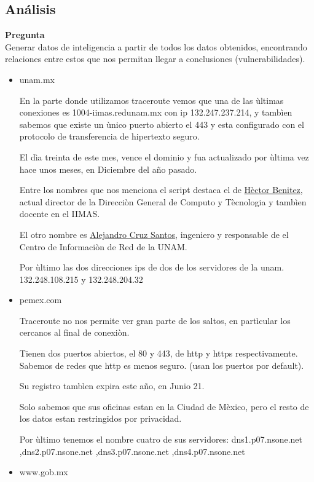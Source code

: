 \documentclass{article}
\newenvironment{problem}[2][Pregunta]
    { \begin{mdframed}[backgroundcolor=gray!20] \textbf{#1 #2} \\}
    {  \end{mdframed}}
\begin{document}
\subsection{Análisis}

\begin{problem}
  {}
  Generar datos de inteligencia a partir de todos los datos obtenidos, encontrando
relaciones entre estos que nos permitan llegar a conclusiones (vulnerabilidades).
\end{problem}

\begin{itemize}
\item unam.mx

  En la parte donde utilizamos traceroute vemos que una de las ùltimas conexiones es
  1004-iimas.redunam.mx con ip 132.247.237.214, y tambìen sabemos que existe un
  ùnico puerto abierto el 443 y esta configurado con el protocolo de transferencia
  de hipertexto seguro.

  El dìa treinta de este mes, vence el dominio y fua actualizado por ùltima vez hace unos
  meses, en Diciembre del año pasado.

  Entre los nombres que nos menciona el script destaca el de
  \href{https://www.tic.unam.mx/hectorbenitez/}{Hèctor Benitez}, actual
  director de la Direcciòn General de Computo y Tècnologia y tambìen docente en el IIMAS.

  El otro nombre es \href{https://www.nic.unam.mx/page5.html}{Alejandro Cruz Santos}, ingeniero
  y responsable de el Centro de Informaciòn de Red de la UNAM.

  Por ùltimo las dos direcciones ips de dos de los servidores de la unam. 132.248.108.215 y
  132.248.204.32
  
\item pemex.com

  Traceroute no nos permite ver gran parte de los saltos, en partìcular los cercanos al final de conexiòn.

  Tienen dos puertos abiertos, el 80 y 443, de http y https respectivamente. Sabemos de redes que http es
  menos seguro. (usan los puertos por default).

  Su registro tambìen expira este año, en Junio 21.

  Solo sabemos que sus oficinas estan en la Ciudad de Mèxico, pero el resto de los datos estan
  restringidos por privacidad.

  Por ùltimo tenemos el nombre cuatro de sus servidores: dns1.p07.nsone.net
  ,dns2.p07.nsone.net
  ,dns3.p07.nsone.net
  ,dns4.p07.nsone.net
\item www.gob.mx


\end{itemize}
\end{document}
